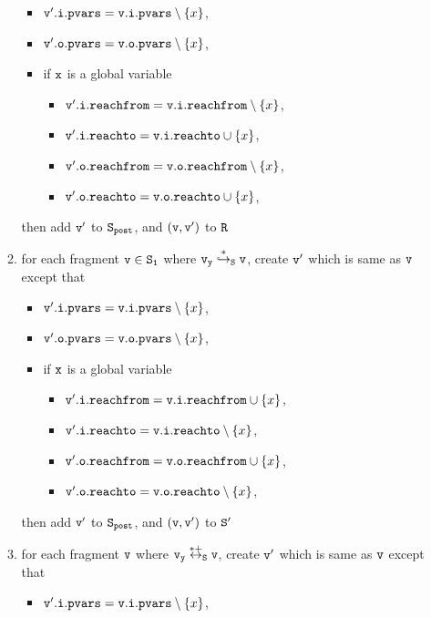 \begin{itemize}
\begin{enumerate}
\begin{itemize}
\item $\mathtt{v}'.\mathtt{i}.\mathtt{pvars} = \mathtt{v}.\mathtt{i}.\mathtt{pvars} \setminus \left\{x\right\}$,
\item $\mathtt{v}'.\mathtt{o}.\mathtt{pvars} = \mathtt{v}.\mathtt{o}.\mathtt{pvars} \setminus \left\{x\right\}$,
\item if $\tt x$ is a global variable
\begin{itemize}
\item $\mathtt{v}'.\mathtt{i}.\mathtt{reachfrom} = \mathtt{v}.\mathtt{i}.\mathtt{reachfrom} \setminus \left\{x\right\}$,
\item $\mathtt{v}'.\mathtt{i}.\mathtt{reachto} = \mathtt{v}.\mathtt{i}.\mathtt{reachto} \cup \left\{x\right\}$,
\item $\mathtt{v}'.\mathtt{o}.\mathtt{reachfrom} = \mathtt{v}.\mathtt{o}.\mathtt{reachfrom} \setminus \left\{x\right\}$,
\item $\mathtt{v}'.\mathtt{o}.\mathtt{reachto} = \mathtt{v}.\mathtt{o}.\mathtt{reachto} \cup \left\{x\right\}$,
\end{itemize}
\end{itemize}
then add $\tt v'$ to $\tt S_{post}$, and $\tt (v,v')$ to $\tt R$
\item for each fragment $\tt v \in S_1$ where $\tt v_y \overset{*}\hookrightarrow_S v$, create $\tt v'$ which is same as $\tt v$ except that
\begin{itemize}
\item $\mathtt{v}'.\mathtt{i}.\mathtt{pvars} = \mathtt{v}.\mathtt{i}.\mathtt{pvars} \setminus \left\{x\right\}$,
\item $\mathtt{v}'.\mathtt{o}.\mathtt{pvars} = \mathtt{v}.\mathtt{o}.\mathtt{pvars} \setminus \left\{x\right\}$,
\item if $\tt x$ is a global variable
\begin{itemize}
\item $\mathtt{v}'.\mathtt{i}.\mathtt{reachfrom} = \mathtt{v}.\mathtt{i}.\mathtt{reachfrom} \cup \left\{x\right\}$,
\item $\mathtt{v}'.\mathtt{i}.\mathtt{reachto} = \mathtt{v}.\mathtt{i}.\mathtt{reachto} \setminus \left\{x\right\}$,
 \item $\mathtt{v}'.\mathtt{o}.\mathtt{reachfrom} = \mathtt{v}.\mathtt{o}.\mathtt{reachfrom} \cup \left\{x\right\}$,
 \item $\mathtt{v}'.\mathtt{o}.\mathtt{reachto} = \mathtt{v}.\mathtt{o}.\mathtt{reachto} \setminus \left\{x\right\}$,
\end{itemize}
\end{itemize}
then add $\tt v'$ to $\tt S_{post}$, and $\tt (v,v')$ to $\tt S'$
\item for each fragment $\tt v$ where $\tt v_y \overset{*+}\leftrightarrow_S v$, create $\tt v'$ which is same as $\tt v$ except that
\begin{itemize}
\item $\mathtt{v}'.\mathtt{i}.\mathtt{pvars} = \mathtt{v}.\mathtt{i}.\mathtt{pvars} \setminus \left\{x\right\}$,

\end{itemize}
\end{enumerate}
\end{itemize}
